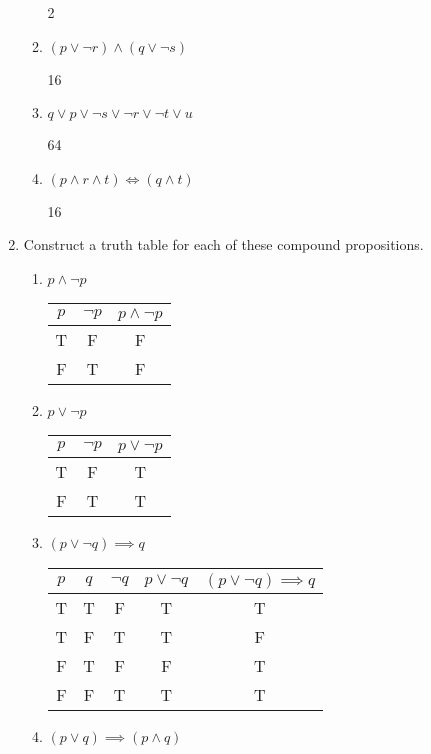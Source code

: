 \documentclass[11pt]{article}
\begin{document}
\begin{enumerate}[label=\textbf{\arabic*.}]
\begin{enumerate}[label=\textbf{\alph*)}]
		2
		
		\item $(p \lor \neg r) \land (q \lor \neg s)$
		
		16
		
		\item $q \lor p \lor \neg s \lor \neg r \lor \neg t \lor u$
		
		64
		
		\item $(p \land r \land t) \iff (q \land t)$
		
		16
	\end{enumerate}

	\item Construct a truth table for each of these compound propositions.
	\begin{enumerate}[label=\textbf{\alph*)}]
		\item $p \land \neg p$
		
		\begin{tabular}{c | c | c}
			$p$ & $\neg p$ & $p \land \neg p$ \\
			\hline
			T &	F &	F \\
			F &	T &	F \\
		\end{tabular}
		
		\item $p \lor \neg p$
		
		\begin{tabular}{c | c | c}
			$p$	& $\neg p$ & $p \lor \neg p$ \\
			\hline
			T & F & T \\
			F & T & T \\
		\end{tabular}
		
		\item $(p \lor \neg q) \implies q$
		
		\begin{tabular}{c | c | c | c | c}
			$p$ & $q$ & $\neg q$ & $p \lor \neg q$ & $(p \lor \neg q) \implies q$ \\
			\hline
			T & T & F & T & T \\
			T & F & T & T &F \\
			F & T & F & F & T \\
			F & F & T & T & T \\
		\end{tabular}
		
		\item $(p \lor q) \implies (p \land q)$
		

\end{enumerate}
\end{enumerate}
\end{document}
